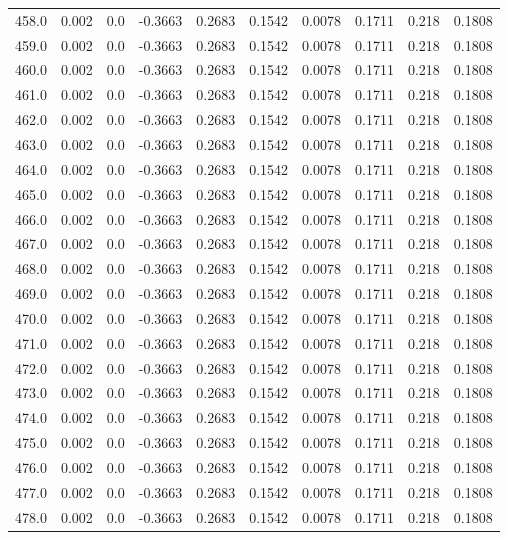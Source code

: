 \begin{longtable}{lrrrrrrrrr}
458.0 & 0.002 & 0.0 & -0.3663 & 0.2683 & 0.1542 & 0.0078 & 0.1711 & 0.218 & 0.1808 \\
459.0 & 0.002 & 0.0 & -0.3663 & 0.2683 & 0.1542 & 0.0078 & 0.1711 & 0.218 & 0.1808 \\
460.0 & 0.002 & 0.0 & -0.3663 & 0.2683 & 0.1542 & 0.0078 & 0.1711 & 0.218 & 0.1808 \\
461.0 & 0.002 & 0.0 & -0.3663 & 0.2683 & 0.1542 & 0.0078 & 0.1711 & 0.218 & 0.1808 \\
462.0 & 0.002 & 0.0 & -0.3663 & 0.2683 & 0.1542 & 0.0078 & 0.1711 & 0.218 & 0.1808 \\
463.0 & 0.002 & 0.0 & -0.3663 & 0.2683 & 0.1542 & 0.0078 & 0.1711 & 0.218 & 0.1808 \\
464.0 & 0.002 & 0.0 & -0.3663 & 0.2683 & 0.1542 & 0.0078 & 0.1711 & 0.218 & 0.1808 \\
465.0 & 0.002 & 0.0 & -0.3663 & 0.2683 & 0.1542 & 0.0078 & 0.1711 & 0.218 & 0.1808 \\
466.0 & 0.002 & 0.0 & -0.3663 & 0.2683 & 0.1542 & 0.0078 & 0.1711 & 0.218 & 0.1808 \\
467.0 & 0.002 & 0.0 & -0.3663 & 0.2683 & 0.1542 & 0.0078 & 0.1711 & 0.218 & 0.1808 \\
468.0 & 0.002 & 0.0 & -0.3663 & 0.2683 & 0.1542 & 0.0078 & 0.1711 & 0.218 & 0.1808 \\
469.0 & 0.002 & 0.0 & -0.3663 & 0.2683 & 0.1542 & 0.0078 & 0.1711 & 0.218 & 0.1808 \\
470.0 & 0.002 & 0.0 & -0.3663 & 0.2683 & 0.1542 & 0.0078 & 0.1711 & 0.218 & 0.1808 \\
471.0 & 0.002 & 0.0 & -0.3663 & 0.2683 & 0.1542 & 0.0078 & 0.1711 & 0.218 & 0.1808 \\
472.0 & 0.002 & 0.0 & -0.3663 & 0.2683 & 0.1542 & 0.0078 & 0.1711 & 0.218 & 0.1808 \\
473.0 & 0.002 & 0.0 & -0.3663 & 0.2683 & 0.1542 & 0.0078 & 0.1711 & 0.218 & 0.1808 \\
474.0 & 0.002 & 0.0 & -0.3663 & 0.2683 & 0.1542 & 0.0078 & 0.1711 & 0.218 & 0.1808 \\
475.0 & 0.002 & 0.0 & -0.3663 & 0.2683 & 0.1542 & 0.0078 & 0.1711 & 0.218 & 0.1808 \\
476.0 & 0.002 & 0.0 & -0.3663 & 0.2683 & 0.1542 & 0.0078 & 0.1711 & 0.218 & 0.1808 \\
477.0 & 0.002 & 0.0 & -0.3663 & 0.2683 & 0.1542 & 0.0078 & 0.1711 & 0.218 & 0.1808 \\
478.0 & 0.002 & 0.0 & -0.3663 & 0.2683 & 0.1542 & 0.0078 & 0.1711 & 0.218 & 0.1808 \\

\end{longtable}
